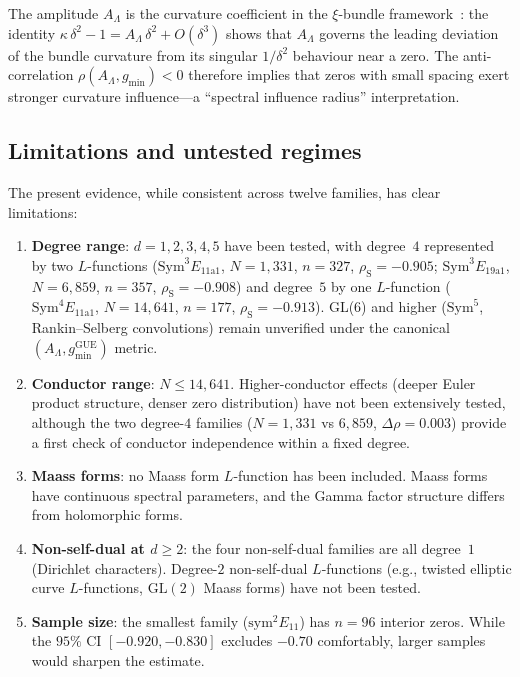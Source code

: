 \documentclass[11pt, a4paper]{article}
\theoremstyle{plain}
\theoremstyle{definition}
\newcommand{\Lam}{\Lambda}
\newcommand{\kap}{\kappa}
\DeclareMathOperator{\GUE}{GUE}
\begin{document}
The amplitude $A_\Lam$ is the curvature coefficient in the
$\xi$-bundle framework~\cite{paper1,paper2}: the identity
$\kap\,\delta^2 - 1 = A_\Lam\,\delta^2 + O(\delta^3)$ shows
that $A_\Lam$ governs the leading deviation of the bundle
curvature from its singular $1/\delta^2$ behaviour near a zero.
The anti-correlation $\rho(A_\Lam, g_{\min}) < 0$ therefore
implies that zeros with small spacing exert stronger curvature
influence---a ``spectral influence radius'' interpretation.

\subsection{Limitations and untested regimes}
\label{ssec:limitations}

The present evidence, while consistent across twelve families,
has clear limitations:

\begin{enumerate}
  \item \textbf{Degree range}: $d = 1, 2, 3, 4, 5$ have been
        tested, with degree~$4$ represented by two $L$-functions
        ($\mathrm{Sym}^3 E_{11\mathrm{a}1}$, $N = 1{,}331$,
        $n = 327$, $\rho_{\mathrm{S}} = -0.905$;
        $\mathrm{Sym}^3 E_{19\mathrm{a}1}$, $N = 6{,}859$,
        $n = 357$, $\rho_{\mathrm{S}} = -0.908$)
        and degree~$5$ by one $L$-function
        ($\mathrm{Sym}^4 E_{11\mathrm{a}1}$, $N = 14{,}641$,
        $n = 177$, $\rho_{\mathrm{S}} = -0.913$).
        GL(6) and higher ($\mathrm{Sym}^5$,
        Rankin--Selberg convolutions) remain unverified under the
        canonical $(A_\Lam, g_{\min}^{\GUE})$ metric.
  \item \textbf{Conductor range}: $N \le 14{,}641$.
        Higher-conductor effects (deeper Euler product structure,
        denser zero distribution) have not been extensively tested,
        although the two degree-$4$ families ($N = 1{,}331$ vs
        $6{,}859$, $\Delta\rho = 0.003$) provide a first check
        of conductor independence within a fixed degree.
  \item \textbf{Maass forms}: no Maass form $L$-function has been
        included.
        Maass forms have continuous spectral parameters, and the
        Gamma factor structure differs from holomorphic forms.
  \item \textbf{Non-self-dual at $d \ge 2$}: the four
        non-self-dual families are all degree~$1$ (Dirichlet
        characters).
        Degree-$2$ non-self-dual $L$-functions (e.g., twisted
        elliptic curve $L$-functions, $\mathrm{GL}(2)$ Maass forms)
        have not been tested.
  \item \textbf{Sample size}: the smallest family
        ($\mathrm{sym}^2 E_{11}$) has $n = 96$ interior zeros.
        While the $95\%$ CI $[-0.920, -0.830]$ excludes $-0.70$
        comfortably, larger samples would sharpen the estimate.
\end{enumerate}
\end{document}
